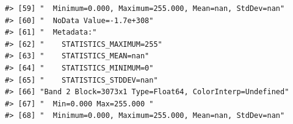 \documentclass[
]{book}
\begin{document}
\begin{verbatim}
#> [59] "  Minimum=0.000, Maximum=255.000, Mean=nan, StdDev=nan"                                                                                                                                                                                                                         
#> [60] "  NoData Value=-1.7e+308"                                                                                                                                                                                                                                                       
#> [61] "  Metadata:"                                                                                                                                                                                                                                                                    
#> [62] "    STATISTICS_MAXIMUM=255"                                                                                                                                                                                                                                                     
#> [63] "    STATISTICS_MEAN=nan"                                                                                                                                                                                                                                                        
#> [64] "    STATISTICS_MINIMUM=0"                                                                                                                                                                                                                                                       
#> [65] "    STATISTICS_STDDEV=nan"                                                                                                                                                                                                                                                      
#> [66] "Band 2 Block=3073x1 Type=Float64, ColorInterp=Undefined"                                                                                                                                                                                                                        
#> [67] "  Min=0.000 Max=255.000 "                                                                                                                                                                                                                                                       
#> [68] "  Minimum=0.000, Maximum=255.000, Mean=nan, StdDev=nan"                                                                                                                                                                                                                         

\end{verbatim}
\end{document}
